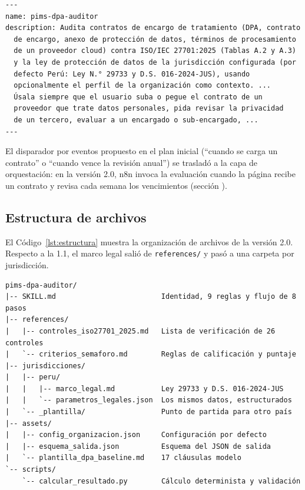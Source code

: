 \documentclass[12pt,letterpaper]{article}
\begin{document}
\begin{lstlisting}[style=codigo, caption={Metadatos de activación de la skill, versión 2.0 (extracto)}, label={lst:frontmatter}]
---
name: pims-dpa-auditor
description: Audita contratos de encargo de tratamiento (DPA, contrato
  de encargo, anexo de protección de datos, términos de procesamiento
  de un proveedor cloud) contra ISO/IEC 27701:2025 (Tablas A.2 y A.3)
  y la ley de protección de datos de la jurisdicción configurada (por
  defecto Perú: Ley N.° 29733 y D.S. 016-2024-JUS), usando
  opcionalmente el perfil de la organización como contexto. ...
  Úsala siempre que el usuario suba o pegue el contrato de un
  proveedor que trate datos personales, pida revisar la privacidad
  de un tercero, evaluar a un encargado o sub-encargado, ...
---
\end{lstlisting}

El disparador por eventos propuesto en el plan inicial (``cuando se carga un contrato'' o ``cuando vence la revisión anual'') se trasladó a la capa de orquestación: en la versión 2.0, n8n invoca la evaluación cuando la página recibe un contrato y revisa cada semana los vencimientos (sección ).

\subsection{Estructura de archivos}

El Código~\ref{lst:estructura} muestra la organización de archivos de la versión 2.0. Respecto a la 1.1, el marco legal salió de \texttt{references/} y pasó a una carpeta por jurisdicción.

\begin{lstlisting}[style=codigo, caption={Estructura de la skill versión 2.0}, label={lst:estructura}, numbers=none]
pims-dpa-auditor/
|-- SKILL.md                         Identidad, 9 reglas y flujo de 8 pasos
|-- references/
|   |-- controles_iso27701_2025.md   Lista de verificación de 26 controles
|   `-- criterios_semaforo.md        Reglas de calificación y puntaje
|-- jurisdicciones/
|   |-- peru/
|   |   |-- marco_legal.md           Ley 29733 y D.S. 016-2024-JUS
|   |   `-- parametros_legales.json  Los mismos datos, estructurados
|   `-- _plantilla/                  Punto de partida para otro país
|-- assets/
|   |-- config_organizacion.json     Configuración por defecto
|   |-- esquema_salida.json          Esquema del JSON de salida
|   `-- plantilla_dpa_baseline.md    17 cláusulas modelo
`-- scripts/
    `-- calcular_resultado.py        Cálculo determinista y validación
\end{lstlisting}
\end{document}
